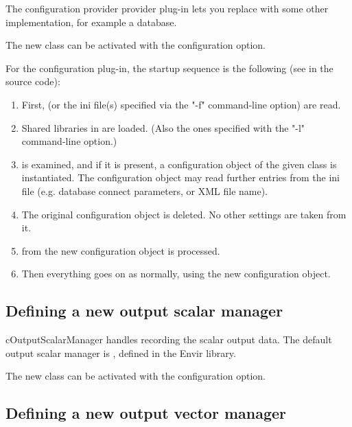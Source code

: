 The configuration provider provider plug-in lets you replace 
with some other implementation, for example a database.

The new class can be activated with the 
configuration option.


For the configuration plug-in, the startup sequence is the following
(see  in the source code):

\begin{enumerate}
  \item First,  (or the ini file(s) specified via the "-f"
     command-line option) are read.
  \item Shared libraries in  are loaded.
     (Also the ones specified with the "-l" command-line option.)
  \item {} is examined, and if it is present,
     a configuration object of the given class is instantiated.
     The configuration object may read further entries from the
     ini file (e.g. database connect parameters, or XML file name).
  \item The original   configuration
     object is deleted. No other settings are taken from it.
  \item {} from the new configuration object is
     processed.
  \item Then everything goes on as normally, using the new configuration
     object.
\end{enumerate}


\subsection{Defining a new output scalar manager}
\label{sec:plugin-exts:outputscalarmanager}

cOutputScalarManager handles recording the scalar output data.
The default output scalar manager is ,
defined in the Envir library.

The new class can be activated with the 
configuration option.


\subsection{Defining a new output vector manager}
\label{sec:plugin-exts:outputvectormanager}

